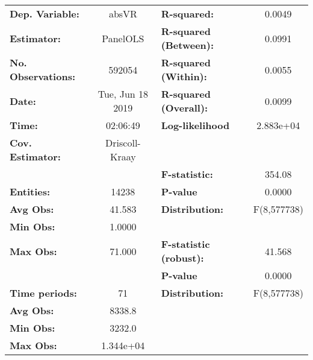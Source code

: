 \begin{center}
\begin{tabular}{lclc}
\toprule
\textbf{Dep. Variable:}                 &       absVR        & \textbf{  R-squared:         }   &      0.0049      \\
\textbf{Estimator:}                     &      PanelOLS      & \textbf{  R-squared (Between):}  &      0.0991      \\
\textbf{No. Observations:}              &       592054       & \textbf{  R-squared (Within):}   &      0.0055      \\
\textbf{Date:}                          &  Tue, Jun 18 2019  & \textbf{  R-squared (Overall):}  &      0.0099      \\
\textbf{Time:}                          &      02:06:49      & \textbf{  Log-likelihood     }   &    2.883e+04     \\
\textbf{Cov. Estimator:}                &   Driscoll-Kraay   & \textbf{                     }   &                  \\
\textbf{}                               &                    & \textbf{  F-statistic:       }   &      354.08      \\
\textbf{Entities:}                      &       14238        & \textbf{  P-value            }   &      0.0000      \\
\textbf{Avg Obs:}                       &       41.583       & \textbf{  Distribution:      }   &   F(8,577738)    \\
\textbf{Min Obs:}                       &       1.0000       & \textbf{                     }   &                  \\
\textbf{Max Obs:}                       &       71.000       & \textbf{  F-statistic (robust):} &      41.568      \\
\textbf{}                               &                    & \textbf{  P-value            }   &      0.0000      \\
\textbf{Time periods:}                  &         71         & \textbf{  Distribution:      }   &   F(8,577738)    \\
\textbf{Avg Obs:}                       &       8338.8       & \textbf{                     }   &                  \\
\textbf{Min Obs:}                       &       3232.0       & \textbf{                     }   &                  \\
\textbf{Max Obs:}                       &     1.344e+04      & \textbf{                     }   &                  \\

\end{tabular}
\end{center}

